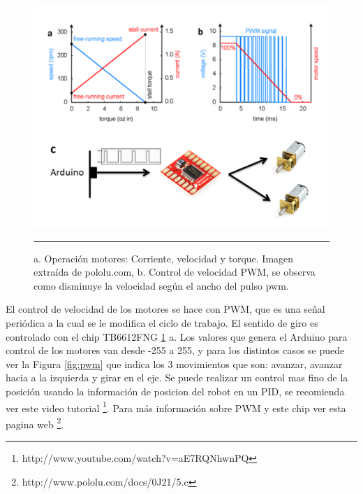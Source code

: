 \begin{figure}[htbp]
	\centering
		\includegraphics[width=\textwidth]{./Figures/graficosMotores.png}
		\rule{35em}{0.5pt}
	\caption[Gráficos Motor DC]{a. Operación motores: Corriente, velocidad y torque. Imagen extraída de pololu.com, b. Control de velocidad PWM, se observa como disminuye la velocidad según el ancho del pulso pwm.}
	\label{fig:DCMotor}
\end{figure}

El control de velocidad de los motores se hace con PWM, que es una señal periódica a la cual se le modifica el ciclo de trabajo. El sentido de giro es controlado con el chip TB6612FNG \ref{fig:DCMotor} a. Los valores que genera el Arduino para control de los motores van desde -255 a 255, y para los distintos casos se puede ver la Figura \ref{fig:pwm} que indica los 3 movimientos que son: avanzar, avanzar hacia a la izquierda y girar en el eje. Se puede realizar un control mas fino de la posición usando la información de posicion del robot en un PID, se recomienda ver este video tutorial \footnote{http://www.youtube.com/watch?v=aE7RQNhwnPQ}. Para más información sobre PWM y este chip ver esta pagina web \footnote{http://www.pololu.com/docs/0J21/5.c}.

